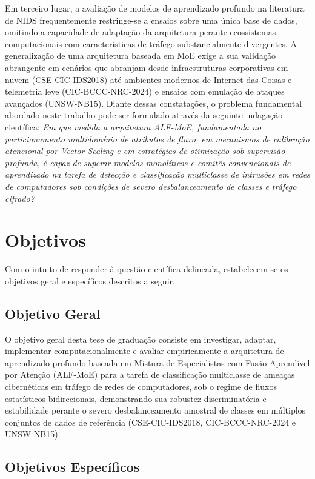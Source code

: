 Em terceiro lugar, a avaliação de modelos de aprendizado profundo na literatura de NIDS frequentemente restringe-se a ensaios sobre uma única base de dados, omitindo a capacidade de adaptação da arquitetura perante ecossistemas computacionais com características de tráfego substancialmente divergentes. A generalização de uma arquitetura baseada em MoE exige a sua validação abrangente em cenários que abranjam desde infraestruturas corporativas em nuvem (CSE-CIC-IDS2018) até ambientes modernos de Internet das Coisas e telemetria leve (CIC-BCCC-NRC-2024) e ensaios com emulação de ataques avançados (UNSW-NB15).
Diante dessas constatações, o problema fundamental abordado neste trabalho pode ser formulado através da seguinte indagação científica: \emph{Em que medida a arquitetura ALF-MoE, fundamentada no particionamento multidomínio de atributos de fluxo, em mecanismos de calibração atencional por Vector Scaling e em estratégias de otimização sob supervisão profunda, é capaz de superar modelos monolíticos e comitês convencionais de aprendizado na tarefa de detecção e classificação multiclasse de intrusões em redes de computadores sob condições de severo desbalanceamento de classes e tráfego cifrado?}

\section{Objetivos}
\label{sec:objetivos}

Com o intuito de responder à questão científica delineada, estabelecem-se os objetivos geral e específicos descritos a seguir.

\subsection{Objetivo Geral}
\label{subsec:obj_geral}

O objetivo geral desta tese de graduação consiste em investigar, adaptar, implementar computacionalmente e avaliar empiricamente a arquitetura de aprendizado profundo baseada em Mistura de Especialistas com Fusão Aprendível por Atenção (ALF-MoE) para a tarefa de classificação multiclasse de ameaças cibernéticas em tráfego de redes de computadores, sob o regime de fluxos estatísticos bidirecionais, demonstrando sua robustez discriminatória e estabilidade perante o severo desbalanceamento amostral de classes em múltiplos conjuntos de dados de referência (CSE-CIC-IDS2018, CIC-BCCC-NRC-2024 e UNSW-NB15).

\subsection{Objetivos Específicos}
\label{subsec:obj_especificos}

